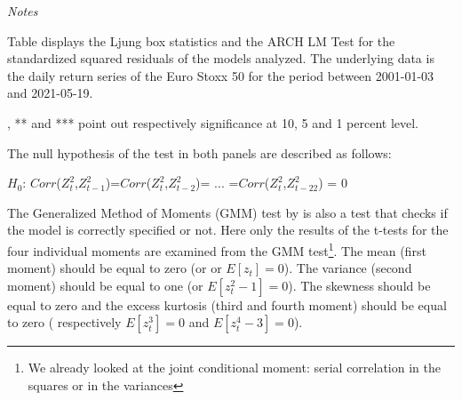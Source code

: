 \documentclass[a4paper, twoside]{templates/ociamthesis}
\begin{document}
\begin{landscape}
\begin{table}[h!]
\begin{threeparttable}
{\begin{tabular}[t]{lllllllll}
\bottomrule
\end{tabular}}
\begin{tablenotes}
\item \textit{Notes} 
\item Table displays the Ljung box statistics and the ARCH LM Test for the standardized squared residuals of the models analyzed. The underlying data is the daily return series of the Euro Stoxx 50 for the period between 2001-01-03 and 2021-05-19.
\item *, ** and *** point out respectively significance at 10, 5 and 1 percent level.
\item The null hypothesis of the test in both panels are described as follows:
\item $H_0$: $Corr$($Z_t^2$,$Z_{t-1}^2$)=$Corr$($Z_t^2$,$Z_{t-2}^2$)= $...$ =$Corr$($Z_t^2$,$Z_{t-22}^2$) = $0$
\end{tablenotes}
\end{threeparttable}
\end{table}
\end{landscape}

The Generalized Method of Moments (GMM) test by \textcite{hansen1982} is also a test that checks if the model is correctly specified or not. Here only the results of the t-tests for the four individual moments are examined from the GMM test\footnote{We already looked at the joint conditional moment: serial correlation in the squares or in the variances}. The mean (first moment) should be equal to zero (or or \(E\left[z_{t}\right]=0\)). The variance (second moment) should be equal to one (or \(E\left[z_{t}^2-1\right]=0\)). The skewness should be equal to zero and the excess kurtosis (third and fourth moment) should be equal to zero ( respectively \(E\left[z_{t}^3\right]=0\) and \(E\left[z_{t}^4-3\right] = 0\)).
\end{document}
